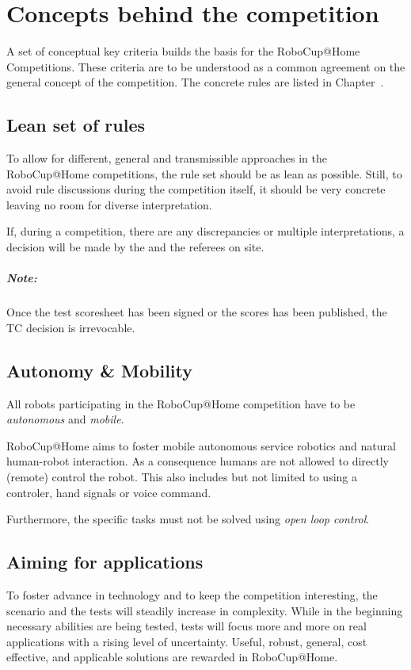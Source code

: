 \chapter{Concepts behind the competition}
\label{chap:concepts}
A set of conceptual key criteria builds the basis for the RoboCup@Home Competitions. These criteria are to be understood as a common agreement on the general concept of the competition. The concrete rules are listed in Chapter~.

\section{Lean set of rules}
\label{concept:lean_set_of_rules}
To allow for different, general and transmissible approaches in the RoboCup@Home competitions, the rule set should be as lean as possible. Still, to avoid rule discussions during the competition itself, it should be very concrete leaving no room for diverse interpretation.

If, during a competition, there are any discrepancies or multiple interpretations, a decision will be made by the  and the referees on site.

\paragraph*{Note: } Once the test scoresheet has been signed or the scores has been published, the TC decision is irrevocable.

\section{Autonomy \& Mobility}
\label{concept:autonomy_and_mobility}
All robots participating in the RoboCup@Home competition have to be \emph{autonomous} and \emph{mobile}.

 RoboCup@Home aims to foster mobile autonomous service robotics and natural human-robot interaction. As a consequence humans are not allowed to directly (remote) control the robot. This also includes but not limited to using a controler, hand signals or voice command.

Furthermore, the specific tasks must not be solved using \emph{open loop control}.

\section{Aiming for applications}
\label{concept:aiming_for_applications}
To foster advance in technology and to keep the competition interesting, the scenario and the tests will steadily increase in complexity. While in the beginning necessary abilities are being tested, tests will focus more and more on real applications with a rising level of uncertainty. Useful, robust, general, cost effective, and applicable solutions are rewarded in RoboCup@Home.

